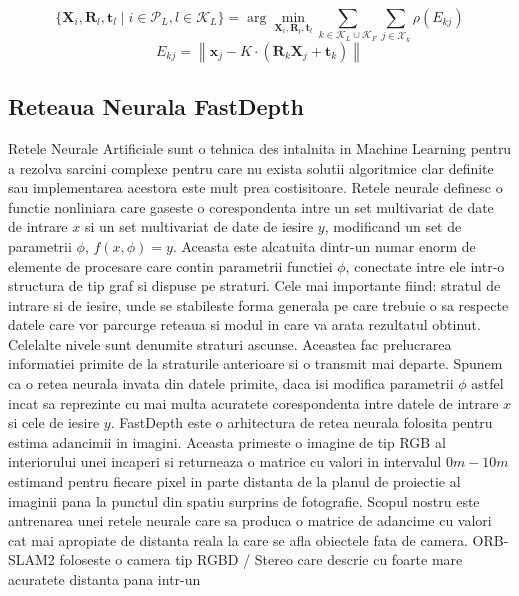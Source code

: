 \documentclass[12pt,a4paper]{report}
\begin{document}
\begin{equation}
\{\mathbf{X}_i, \mathbf{R}_l, \mathbf{t}_l \mid i \in \mathcal{P}_L, l \in \mathcal{K}_L\} = \arg \min_{\mathbf{X}_i, \mathbf{R}_l, \mathbf{t}_l} \sum_{k \in \mathcal{K}_L \cup \mathcal{K}_F} \sum_{j \in \mathcal{X}_k} \rho(E_{kj})
\end{equation}
\begin{equation}  
E_{kj} = \left\| \mathbf{x}_{j} - K \cdot \left(\mathbf{R}_k \mathbf{X}_j + \mathbf{t}_k\right) \right\|
\end{equation}

\subsection{Reteaua Neurala FastDepth}
Retele Neurale Artificiale sunt o tehnica des intalnita in Machine Learning pentru a rezolva 
sarcini complexe pentru care nu exista solutii algoritmice clar definite sau implementarea acestora 
este mult prea costisitoare. Retele neurale definesc o functie nonliniara care gaseste o 
corespondenta intre un set multivariat de date de intrare \(x\) si un set multivariat de 
date de iesire \(y\), modificand un set de parametrii $ \phi $, $ f(x, \phi) = y $. Aceasta este
alcatuita dintr-un numar enorm de elemente de procesare care contin parametrii functiei $ \phi $,
conectate intre ele intr-o structura de tip graf si dispuse pe straturi. Cele mai importante fiind: stratul de intrare
si de iesire, unde se stabileste forma generala pe care trebuie o sa respecte datele care vor
parcurge reteaua si modul in care va arata rezultatul obtinut. Celelalte nivele sunt denumite 
straturi ascunse. Aceastea fac prelucrarea informatiei primite de la straturile anterioare 
si o transmit mai departe. Spunem ca o retea neurala invata din datele primite, daca isi 
modifica parametrii $ \phi $ astfel incat sa reprezinte cu mai multa acuratete corespondenta
intre datele de intrare \(x\) si cele de iesire \(y\).
FastDepth este o arhitectura de retea neurala folosita pentru estima adancimii in imagini. 
Aceasta primeste o imagine de tip RGB al interiorului unei incaperi si returneaza o matrice
cu valori in intervalul $0m - 10m$ estimand pentru fiecare pixel in parte distanta de la
planul de proiectie al imaginii pana la punctul din spatiu surprins de fotografie. Scopul nostru
este antrenarea unei retele neurale care sa produca o matrice de adancime cu valori cat mai 
apropiate de distanta reala la care se afla obiectele fata de camera. ORB-SLAM2
foloseste o camera tip RGBD / Stereo care descrie cu foarte mare acuratete distanta pana intr-un
\end{document}
